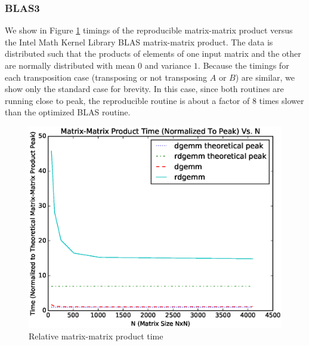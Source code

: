   \subsubsection{BLAS3}
    We show in Figure \ref{fig:gemm_timings} timings of the reproducible matrix-matrix product versus the Intel Math Kernel Library \cite{MKL} BLAS matrix-matrix product. The data is distributed such that the products of elements of one input matrix and the other are normally distributed with mean $0$ and variance $1$. Because the timings for each transposition case (transposing or not transposing $A$ or $B$) are similar, we show only the standard case for brevity. In this case, since both routines are running close to peak, the reproducible routine is about a factor of 8 times slower than the optimized BLAS routine.
  \begin{figure}[H]
  \begin{center}
  \includegraphics[width=\textwidth]{plots/gemm_comparison}
  \caption{Relative matrix-matrix product time}
  \label{fig:gemm_timings}
  \end{center}
  \end{figure}
